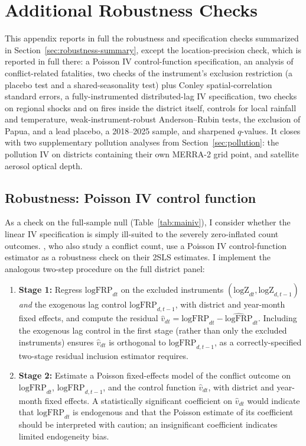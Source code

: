 \documentclass[12pt]{article}
\begin{document}
\section{Additional Robustness Checks}
\label{sec:appendixrobustness}

This appendix reports in full the robustness and specification checks summarized in Section~\ref{sec:robustness-summary}, except the location-precision check, which is reported in full there: a Poisson IV control-function specification, an analysis of conflict-related fatalities, two checks of the instrument's exclusion restriction (a placebo test and a shared-seasonality test) plus Conley spatial-correlation standard errors, a fully-instrumented distributed-lag IV specification, two checks on regional shocks and on fires inside the district itself, controls for local rainfall and temperature, weak-instrument-robust Anderson--Rubin tests, the exclusion of Papua, and a lead placebo, a 2018--2025 sample, and sharpened $q$-values. It closes with two supplementary pollution analyses from Section~\ref{sec:pollution}: the pollution IV on districts containing their own MERRA-2 grid point, and satellite aerosol optical depth.

\subsection{Robustness: Poisson IV control function}
\label{sec:poisson}

As a check on the full-sample null (Table~\ref{tab:mainiv}), I consider whether the linear IV specification is simply ill-suited to the severely zero-inflated count outcomes. \citet{lu2023fish}, who also study a conflict count, use a Poisson IV control-function estimator \citep{terzabasurathouz2008} as a robustness check on their 2SLS estimates. I implement the analogous two-step procedure on the full district panel:

\begin{enumerate}
    \item \textbf{Stage 1:} Regress $\text{logFRP}_{dt}$ on the excluded instruments $(\text{logZ}_{dt}, \text{logZ}_{d,t-1})$ \emph{and} the exogenous lag control $\text{logFRP}_{d,t-1}$, with district and year-month fixed effects, and compute the residual $\hat{v}_{dt} = \text{logFRP}_{dt} - \widehat{\text{logFRP}}_{dt}$. Including the exogenous lag control in the first stage (rather than only the excluded instruments) ensures $\hat{v}_{dt}$ is orthogonal to $\text{logFRP}_{d,t-1}$, as a correctly-specified two-stage residual inclusion estimator requires.
    \item \textbf{Stage 2:} Estimate a Poisson fixed-effects model of the conflict outcome on $\text{logFRP}_{dt}$, $\text{logFRP}_{d,t-1}$, and the control function $\hat{v}_{dt}$, with district and year-month fixed effects. A statistically significant coefficient on $\hat{v}_{dt}$ would indicate that $\text{logFRP}_{dt}$ is endogenous and that the Poisson estimate of its coefficient should be interpreted with caution; an insignificant coefficient indicates limited endogeneity bias.
\end{enumerate}
\end{document}
